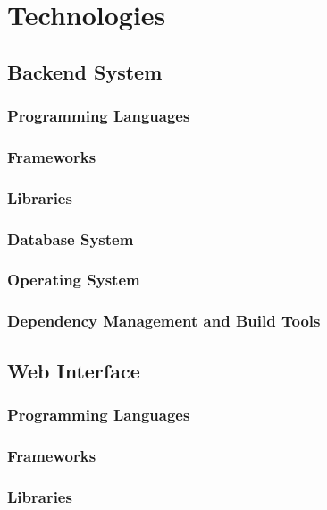 \documentclass[11pt,fleqn]{book} %
\begin{document}
	


\chapter{Technologies}

	\section{Backend System}
		\subsection{Programming Languages}
		\subsection{Frameworks}
		\subsection{Libraries}
		\subsection{Database System}
		\subsection{Operating System}
		\subsection{Dependency Management and Build Tools}
	\section{Web Interface}
		\subsection{Programming Languages}
		\subsection{Frameworks}
		\subsection{Libraries}
\end{document}
